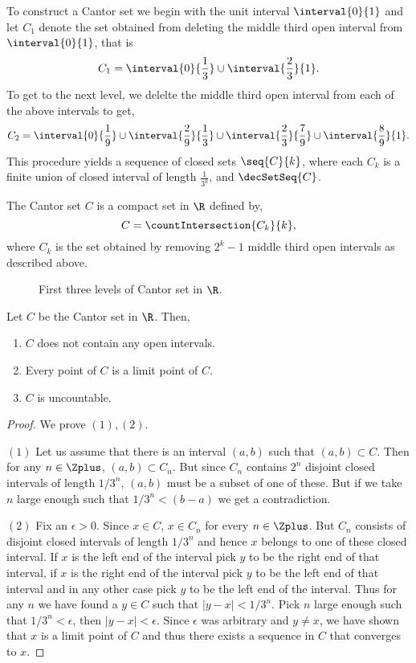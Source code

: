 To construct a Cantor set we begin with the unit interval $\interval{0}{1}$ and let $C_1$ denote the set
obtained from deleting the middle third open interval from $\interval{0}{1}$, that is
\[ C_1 = \interval{0}{\frac{1}{3}} \cup \interval{\frac{2}{3}}{1}.\]
To get to the next level, we delelte the middle third open interval from each of the above intervals to get,
\[ C_2 = \interval{0}{\frac{1}{9}}\cup \interval{\frac{2}{9}}{\frac{1}{3}} \cup
    \interval{\frac{2}{3}}{\frac{7}{9}} \cup \interval{\frac{8}{9}}{1}.\]
This procedure yields a sequence of closed sets $\seq{C}{k}$, where each $C_k$ is a finite union of closed
interval of length $\frac{1}{3^k}$, and $\decSetSeq{C}$.
\begin{Definition}
    The Cantor set $C$ is a compact set in $\R$ defined by,
    \[C = \countIntersection{C_k}{k},\]
    where $C_k$ is the set obtained by removing $2^k - 1$ middle third open intervals as described above.
\end{Definition}
\begin{figure}
    
    \caption{First three levels of Cantor set in $\R$.}\label{fig:tikz:cantor_set}
\end{figure}
\begin{Proposition}\label{prop:cantor_set}
    Let $C$ be the Cantor set in $\R$. Then,
    \begin{enumerate}
	\item
	    $C$ does not contain any open intervals.
	\item
	    Every point of $C$ is a limit point of $C$.
	\item
	    $C$ is uncountable.
    \end{enumerate}
\end{Proposition}
\begin{proof}
    We prove $(1),(2)$.

    $(1)$ Let us assume that there is an interval $(a,b)$ such that $(a,b) \subset C$. Then for any $n \in
    \Zplus$, $(a,b) \subset C_n$. But since $C_n$ contains $2^n$ disjoint closed intervals of length
    $1/3^n$, $(a,b)$ must be a subset of one of these. But if we take $n$ large enough such that
    $1/3^n < (b-a)$ we get a contradiction. 

    $(2)$ Fix an $\epsilon > 0$.
    Since $x \in C$, $x \in C_n$ for every $n \in \Zplus$. But $C_n$ consists of disjoint closed
    intervals of length $1/3^n$ and hence $x$ belongs to one of these closed interval. If $x$ is the
    left end of the interval pick $y$ to be the right end of that interval, if $x$ is the right
    end of the interval pick $y$ to be the left end of that interval and in any other case pick
    $y$ to be the left end of the interval. Thus for any $n$ we have found a $y \in C$ such 
    that $\lvert y - x\rvert < 1/3^n$. Pick $n$ large enough such that $1/3^n < \epsilon$, then
    $\lvert y - x\rvert < \epsilon$. Since $\epsilon$ was arbitrary and $y \neq x$, we have shown
    that $x$ is a limit point of $C$ and thus there exists a sequence in $C$ that converges to $x$.
\end{proof}

